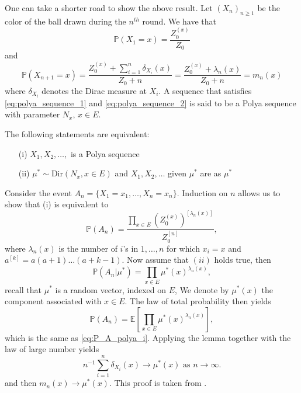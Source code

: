 \begin{remark}\label{req:alternative_proof}
One can take a shorter road to show the above result. Let $(X_n)_{n\geq1}$ be the color of the ball drawn during the $n^{th}$ round. We have that 
\begin{equation}\label{eq:polya_sequence_1}
\mathbb{P}(X_1=x) = \frac{Z_0^{(x)}}{Z_{0}}
\end{equation}
and 
\begin{equation}\label{eq:polya_sequence_2}
\mathbb{P}(X_{n+1}=x) = \frac{Z_0^{(x)} + \sum_{i=1}^n\delta_{X_i}(x)}{Z_0+n} = \frac{Z_0^{(x)} + \lambda_n(x)}{Z_0+n} = m_n(x)
\end{equation}
where $\delta_{X_i}$ denotes the Dirac measure at $X_i$.
A sequence that satisfies \eqref{eq:polya_sequence_1} and \eqref{eq:polya_sequence_2} is said to be a Polya sequence with parameter $N_x\text{, }x\in E$.
\begin{lemma}
The following statements are equivalent:
\begin{itemize}
\item[(i)] $X_1,X_2,\ldots,$ is a Polya sequence
\item[(ii)] $\mu^{\ast}\sim \text{Dir}(N_x,x\in E)$ and $X_1,X_2,\ldots$ given $\mu^\ast$ are \iid as $\mu^\ast$
\end{itemize}
\end{lemma}
Consider the event $A_n = \{X_1 = x_1,\ldots, X_n = x_n\}$. Induction on $n$ allows us to show that (i) is equivalent to 
\begin{equation}\label{eq:P_A_polya_i}
\mathbb{P}(A_n) = \frac{\prod_{x\in E} \left(Z_0^{(x)}\right)^{[\lambda_n(x)]}}{Z_0^{[n]}},
\end{equation}
where $\lambda_n(x)$ is the number of $i$'s in $1,\ldots, n$ for which $x_i = x$ and $a^{[k]} = a(a+1)\ldots(a+k-1)$.  Now assume that $(ii)$ holds true, then 
$$
\mathbb{P}(A_n|\mu^\ast) = \prod_{x\in E}\mu^\ast(x)^{\lambda_n(x)},
$$
recall that $\mu^\ast$ is a random vector, indexed on $E$, We denote by $\mu^\ast(x)$ the component associated with $x\in E$. The law of total probability then yields
\begin{equation}\label{eq:P_A_polya_ii}
\mathbb{P}(A_n) = \mathbb{E}\left[\prod_{x\in E}\mu^\ast(x)^{\lambda_n(x)}\right],
\end{equation}
which is the same as \eqref{eq:P_A_polya_i}. Applying the lemma together with the law of large number yields 
$$
n^{-1}\sum_{i=1}^n\delta_{X_i}(x) \rightarrow \mu^{\ast}(x)\text{ as } n\rightarrow\infty.
$$
and then $m_n(x)\rightarrow\mu^{\ast}(x)$. This proof is taken from \citet{Blackwell1973}.
\end{remark}

